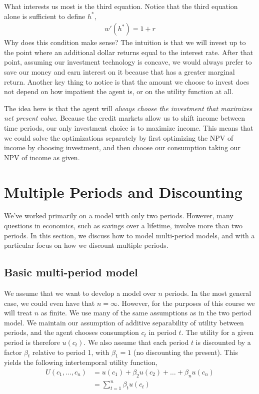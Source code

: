 What interests us most is the third equation. Notice that the third equation alone is sufficient to define $h^*$, 
\begin{align*}
    w'(h^*) = 1 + r
\end{align*}
Why does this condition make sense? The intuition is that we will invest up to the point where an additional dollar returns equal to the interest rate. After that point, assuming our investment technology is concave, we would always prefer to save our money and earn interest on it because that has a greater marginal return. Another key thing to notice is that the amount we choose to invest does not depend on how impatient the agent is, or on the utility function at all. 

The idea here is that the agent will \emph{always choose the investment that maximizes net present value}. Because the credit markets allow us to shift income between time periods, our only investment choice is to maximize income. This means that we could solve the optimizations separately by first optimizing the NPV of income by choosing investment, and then choose our consumption taking our NPV of income as given.

\section{Multiple Periods and Discounting}
We've worked primarily on a model with only two periods. However, many questions in economics, such as savings over a lifetime, involve more than two periods. In this section, we discuss how to model multi-period models, and with a particular focus on how we discount multiple periods.

\subsection*{Basic multi-period model}
We assume that we want to develop a model over $n$ periods. In the most general case, we could even have that $n = \infty$. However, for the purposes of this course we will treat $n$ as finite. We use many of the same assumptions as in the two period model. We maintain our assumption of additive separability of utility between periods, and the agent chooses consumption $c_t$ in period $t$. The utility for a given period is therefore $u(c_t)$. We also assume that each period $t$ is discounted by a factor $\beta_t$ relative to period 1, with $\beta_1 = 1$ (no discounting the present). This yields the following intertemporal utility function,
\begin{align*}
    U(c_1, \dots, c_n) &= u(c_1) + \beta_2 u(c_2) + \dots + \beta_n u(c_n) \\
    &= \sum_{t = 1}^n \beta_t u(c_t)
\end{align*}

